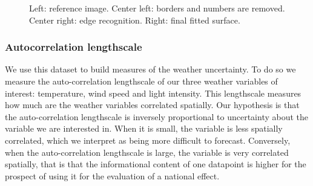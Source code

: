 \begin{figure}[!ht]
\begin{center} 
 \end{center}
\caption{\small Left: reference image. Center left: borders and numbers are removed. Center right: edge recognition. Right: final fitted surface. }
\label{fig:mciel}
\end{figure}

\subsubsection{Autocorrelation lengthscale}
\label{autocorr}
We use this dataset to build measures of the weather uncertainty. To do so we measure the auto-correlation lengthscale of our three weather variables of interest: temperature, wind speed and light intensity. This lengthscale measures how much are the weather variables correlated spatially. Our hypothesis is that the auto-correlation lengthscale is inversely proportional to uncertainty about the variable we are interested in. When it is small, the variable is less spatially correlated, which we interpret as being more difficult to forecast. Conversely, when the auto-correlation lengthscale is large, the variable is very correlated spatially, that is that the informational content of one datapoint is higher for the prospect of using it for the evaluation of a national effect.\\

